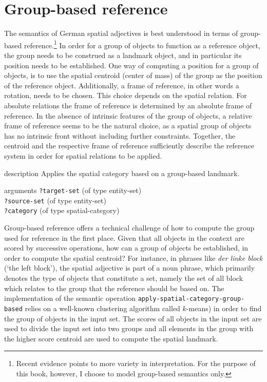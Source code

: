 \section{Group-based reference}
The semantics of German spatial adjectives is best understood in terms of 
group-based reference.\footnote{Recent evidence \citep{moratz2006spatial} 
points to more variety in interpretation. For the purpose of this book, however,
I choose to model group-based semantics only.} In order for a group of objects 
to function as a reference object, the group needs to be construed as a landmark object, and in
particular its position needs to be established. One way of computing a position
for a group of objects, is to use the spatial centroid (center of mass) of the group 
as the position of the reference object. Additionally, a frame of reference, in other words
a rotation, needs to be chosen. This choice depends on the spatial relation. For
absolute relations the frame of reference is determined by an absolute 
frame of reference. In the absence of intrinsic features of the group of objects,
a relative frame of reference seems to be the natural choice, as a spatial group
of objects has no intrinsic front without including further constraints. 
Together, the centroid and the respective frame of reference sufficiently 
describe the reference system in order for spatial 
relations to be applied.

\begin{explanation}{description}
Applies the spatial category based on a group-based landmark. 
\end{explanation}
\begin{explanation}{arguments}
{\footnotesize\verb+?target-set+} (of type entity-set) \\
{\footnotesize\verb+?source-set+} (of type entity-set) \\
{\footnotesize\verb+?category+} (of type spatial-category)
\vspace{0.3cm}
\end{explanation}

Group-based reference offers a technical challenge of how to 
compute the group used for reference in the first place. Given that
all objects in the context are scored by successive operations, how can
a group of objects be established, in order to compute the
spatial centroid? For instance, in phrases like \textit{der linke block} (`the left block'),
the spatial adjective is part of a noun phrase, which primarily denotes the type of
objects that constitute a set, namely the set of all block which relates to 
the group that the reference should be based on.
The implementation of the semantic operation 
{\footnotesize\tt apply-spatial-category-group-based} relies on a well-known clustering algorithm
called $k$-means) \citep{lloyd1982least} in order to find the group 
of objects in the input set. The scores of all objects in the input set 
are used to divide the input set into two groups and all elements 
in the group with the higher score centroid are used to compute 
the spatial landmark. 


